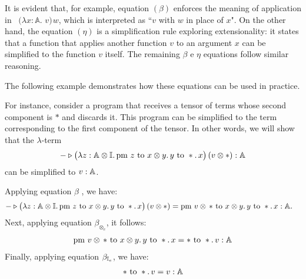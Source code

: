 It is evident that, for example, equation $(\beta)$ enforces the meaning of application in  $(\lambda x : \mathbb{A}.$ $v) \hspace{1pt} w $, which is interpreted as ``$v$ with $w$ in place of $x$".
On the other hand, the equation $(\eta)$ is a simplification rule exploring extensionality: it states that a function that applies another function $v$ to an argument $x$ can be simplified to the function $v$ itself. 
The remaining $\beta$ e $\eta$ equations follow similar reasoning.

The following example demonstrates how these equations can be used in practice.

\begin{example} \label{ex:eq_contex_gen}
 For instance, consider a program that receives a tensor of terms whose second component is $*$ and discards it. This program can be simplified to the term corresponding to the first component of the tensor. In other words, we will show that the $\lambda$-term
\[
 - \triangleright \big(\lambda z : \mathbb{A} \otimes \mathbb{I}.\, \text{pm } z \text{ to } x \otimes y.\, y \text{ to } *.\, x\big)\, (v \otimes *) : \mathbb{A}
\]
can be simplified to $v : \mathbb{A}$.

Applying equation $\beta$ , we have:
\begin{equation*}
  \begin{split}
 - \triangleright \big(\lambda z : \mathbb{A} \otimes \mathbb{I}. \, \text{pm } z \text{ to } x \otimes y. \, y \text{ to } *.\, x \big) \, (v \otimes  *) 
&= \text{pm }  v \otimes \, * \text{ to } x \otimes y. \, y \text{ to } *.\, x  : \mathbb{A}. 
 \end{split}
\end{equation*}
Next, applying  equation $\beta_{\otimes_e}$, it follows:
\begin{align*}
\text{pm }  v \otimes \, * \text{ to } x \otimes y. \, y \text{ to } *.\, x  
=   * \text{ to } *.\, v: \mathbb{A}
\end{align*}
Finally, applying  equation $\beta_{\mathbb{I}_e}$, we have:
\begin{align*}
 * \text{ to } *.\, v = v: \mathbb{A}
\end{align*}

\end{example}


 


\begin{comment}
\begin{definition}
  Let \( S \) be a set. A \emph{relation} on \( S \) is a subset \( R \subseteq S \times S \). An ordered pair \( (s_1, s_2) \in R \) means that \( s_1 \) is related to \( s_2 \).
\end{definition}
\end{comment}


